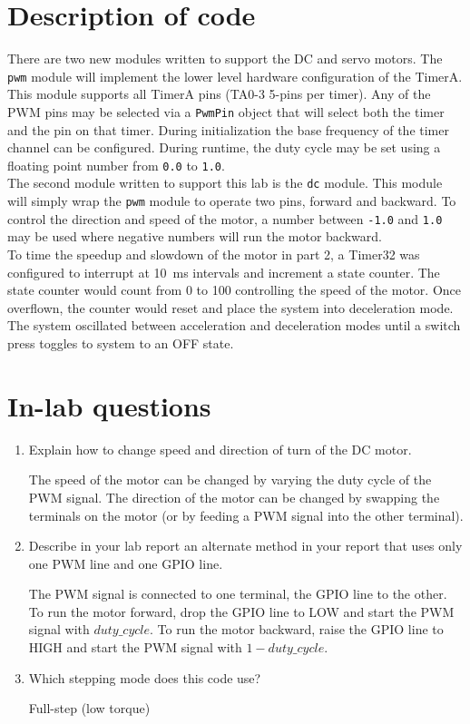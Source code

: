 \documentclass[CMPE]{../KGCOEReport}
\def\code#1{\texttt{#1}}
\begin{document}
	\pagebreak
	\section*{Description of code}

	There are two new modules written to support the DC and servo motors. The \code{pwm}
	module will implement the lower level hardware configuration of the TimerA. This
	module supports all TimerA pins (TA0-3 5-pins per timer). Any of the PWM pins may
	be selected via a \code{PwmPin} object that will select both the timer and the pin
	on that timer. During initialization the base frequency of the timer channel can be
	configured. During runtime, the duty cycle may be set using a floating point number
	from \code{0.0} to \code{1.0}.\\

	The second module written to support this lab is the \code{dc} module. This module
	will simply wrap the \code{pwm} module to operate two pins, forward and backward.
	To control the direction and speed of the motor, a number between \code{-1.0} and
	\code{1.0} may be used where negative numbers will run the motor backward.\\

	To time the speedup and slowdown of the motor in part 2, a Timer32 was configured
	to interrupt at \SI{10}{\milli\s} intervals and increment a state counter. The
	state counter would count from 0 to 100 controlling the speed of the motor. Once
	overflown, the counter would reset and place the system into deceleration mode.
	The system oscillated between acceleration and deceleration modes until a switch
	press toggles to system to an OFF state.

	\section*{In-lab questions}

	\begin{enumerate}
	\item{Explain how to change speed and direction of turn of the DC motor.}

	The speed of the motor can be changed by varying the duty cycle of the PWM signal.
	The direction of the motor can be changed by swapping the terminals on the motor
	(or by feeding a PWM signal into the other terminal).

	\item{Describe in your lab report an alternate method in your report
	that uses only one PWM line and one GPIO line.}

	The PWM signal is connected to one terminal, the GPIO line to the other. To run
	the motor forward, drop the GPIO line to LOW and start the PWM signal with
	$duty\_cycle$. To run the
	motor backward, raise the GPIO line to HIGH and start the PWM signal with
	$1 - duty\_cycle$.

	\item{Which stepping mode does this code use?}

	Full-step (low torque)

	\end{enumerate}


\end{document}
